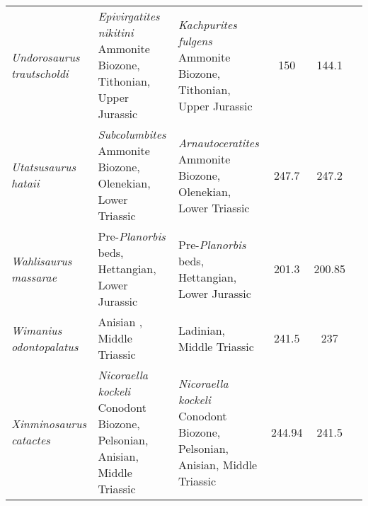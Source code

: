 \begin{longtabu}{>{\itshape}lXXSSl}
	Undorosaurus trautscholdi                            & \emph{Epivirgatites nikitini} Ammonite Biozone, Tithonian, Upper Jurassic                                                          & \emph{Kachpurites fulgens} Ammonite Biozone, Tithonian, Upper Jurassic                                                             & 150                      & 144.1                    & \cite{Arkhangelsky2014} \\               
	Utatsusaurus hataii                                  & \emph{Subcolumbites} Ammonite Biozone, Olenekian, Lower Triassic                                                                   & \emph{Arnautoceratites} Ammonite Biozone, Olenekian, Lower Triassic                                                                & 247.7                    & 247.2                    & \cite{Shikama1978} \\                    
	Wahlisaurus massarae                                 & Pre-\emph{Planorbis} beds, Hettangian, Lower Jurassic                                                                              & Pre-\emph{Planorbis} beds, Hettangian, Lower Jurassic                                                                              & 201.3                    & 200.85                   & \cite{Lomax2016} \\                      
	Wimanius odontopalatus                               & Anisian , Middle Triassic                                                                                                          & Ladinian, Middle Triassic                                                                                                          & 241.5                    & 237                      & \cite{Maisch1998a} \\                    
	Xinminosaurus catactes                               & \emph{Nicoraella kockeli} Conodont Biozone, Pelsonian, Anisian, Middle Triassic                                                    & \emph{Nicoraella kockeli} Conodont Biozone, Pelsonian, Anisian, Middle Triassic                                                    & 244.94                   & 241.5                    & \cite{Jiang2008a} \\                     
\end{longtabu}                                        